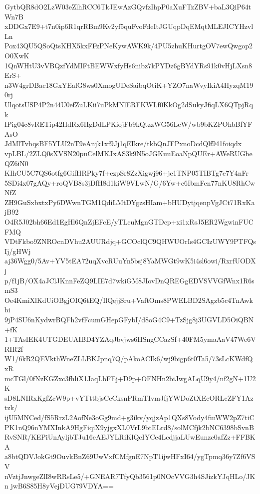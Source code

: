 GytbQR8dO2LzW03eZlhRCC6TkJEwAzGQvfzIhpP0aXuFTzZBV+baL3QiP64tWn7B
xDDGx7E9+t7n0ip6R1qrRBm9Kv2yf5quFvoFdeItJGUqpDqEMqtMLEJICYHzvlLn
Pox43QU5QSoQtsKHX5kxFFzPNeKywAWK9k/4PU5zhuKHurtgOV7ewQwgop2O0XwK
1QnWHtU3vVBQzfYdMIFtBEWWxfyHs6nibz7kPYDz6gBYdYRs91k0vHjLXsn8ErS+
n3W4grDBac18GxYEalG8ws0XmogUDeSaibqOtiK+YZO7naWvyIkiA4HyzqM190rj
UlqotsUSP4P2n44U0efZuLKii7uPkMNlERFKWLf0KkOg2dSukyJfiqLX6QTpjRqk
IPig04c8vRETip42HdRx6HgDdLPKiojFb9kQtzzWG56LcW/wb9bKZPOhbBfYFAsO
JdMlTvbqsBF5YLU2nT9eAnjk1xf9Jj1qEIkre/tkbQnJFPxnoDcdQlf941foiqdx
vpLBL/2ZLQ0sXVSN20puCelMKJxAS3k9N5oJGKuuEoaNpQUEr+AWeRUGbeQZ6iN0
KIhCU5C7QS6otfg6GifHRPky7f+ezpSr8ZzXigwj96+je1TNP05TIBTg7e7Y4nFr
5SDi4x07gAQy+roQVB8s3jDfH8d1kiW9VLwN/G/6Yw+c6IbmFen77nKU8RhCwNfZ
ZH9GuSxbxtxPy6DWwnTGM1QdiLMtDYgzsHIam+bHUDytjqenpVgJCt71RxKajB92
O4R5J02bh66Ed1EgHl6QnZjEFcE/yTLcuMgnGTDcp+xi1xRsJ5ER2WgwinFUCFMQ
VDtFkbo9ZNROcnDVhu2AUURdjq+GCOclQC9QHWUOrIs4GCIzUWY9PTFQsIj/gHWj
aj36Wgg0/5Av+YV5tEA72uqXvcRUuYn5bsj8YaMWGt9wK5i4sl6owi/RxrfUODXj
p/f1jB/OX4aJClJKnnFeZQ9LIE7d7wkiGM8JIovDnQREGgEDVSVVGfWnx1R6smS3
Oe4KmiXlKdUiOBgjOIQ6tEQ/IlQejjSru+VaftOms8PWELBD2SAgzb5c4TnAwkbi
9jP4SU6nKydwrBQFh2vfFcumGHepGFybI/d8oG4C9+TzSjg8j3UGVLD5OiQBN+fK
1+TAsIEK4UTGDEUAIBD4YZAqJbvjws6HSngCCazSf+40FM5ymaAaV47We6VRIR2f
W1/6kR2QEVkthWneZLLBKJpnq7Q/pAkoACIk6/wj9bigp6t0Ta5/73sLcKWdfQxR
mcTGl/0fNzKGZxc3fhliX1JaqLbFEj+D9p+OFNHn2biJwgALqU9y4/nf2gN+1U2K
sD8LNIRxKgfZcW9p+vYTttbjsCeCksnPRmTIvmJfjYWDoZtXEcORLcZFY1Aztzk/
ijU5MNCed/fS5RrzL2AofNe3oGg9md+g3ikv/yqjzAp1QXs8Vody4fmWW2pZ7tiC
PK1nQ96nYMXInkA9HgFiqiX9yjgxXL0VrL9btELrd8/solMCfjk2bNC6398bSvnB
RvSNR/KEPiUnAyljbTJu16eAEJYLRiKlQcIYCe4LcdjjaLUwEunzc0afZz+FFBKA
a8btQDVJokGt9OuvkBnZ69UwVxfCMfgnE7NpT1ijwHFxI64/ygTpmq36y7Zf6VSV
nVztjJnwgeZlI8wRRsLe5/+GNEAR7TfyQb3561p0NOcVVG3h4SJizkYJqHLo/JKn
jwB6S85H8yVejDUG79VDYA==
